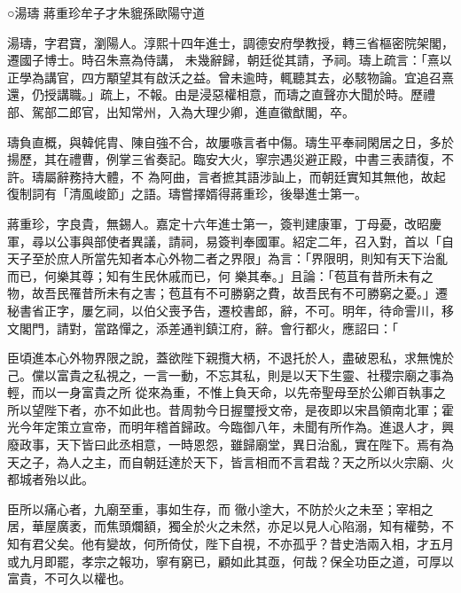 
\begin{pinyinscope}

 ○湯璹
 蔣重珍牟子才朱貔孫歐陽守道



 湯璹，字君寶，瀏陽人。淳熙十四年進士，調德安府學教授，轉三省樞密院架閣，遷國子博士。時召朱熹為侍講，
 未幾辭歸，朝廷從其請，予祠。璹上疏言：「熹以正學為講官，四方顒望其有啟沃之益。曾未逾時，輒聽其去，必駭物論。宜追召熹還，仍授講職。」疏上，不報。由是浸惡權相意，而璹之直聲亦大聞於時。歷禮部、駕部二郎官，出知常州，入為大理少卿，進直徽猷閣，卒。



 璹負直概，與韓侂胄、陳自強不合，故屢嗾言者中傷。璹生平奉祠閑居之日，多於揚歷，其在禮曹，例掌三省奏記。臨安大火，寧宗遇災避正殿，中書三表請復，不許。璹屬辭務持大體，不
 為阿曲，言者摭其語涉訕上，而朝廷實知其無他，故起復制詞有「清風峻節」之語。璹嘗擇婿得蔣重珍，後舉進士第一。



 蔣重珍，字良貴，無錫人。嘉定十六年進士第一，簽判建康軍，丁母憂，改昭慶軍，尋以公事與部使者異議，請祠，易簽判奉國軍。紹定二年，召入對，首以「自天子至於庶人所當先知者本心外物二者之界限」為言：「界限明，則知有天下治亂而已，何樂其尊；知有生民休戚而已，何
 樂其奉。」且論：「苞苴有昔所未有之物，故吾民罹昔所未有之害；苞苴有不可勝窮之費，故吾民有不可勝窮之憂。」遷秘書省正字，屢乞祠，以伯父喪予告，遷校書郎，辭，不可。明年，待命霅川，移文閣門，請對，當路憚之，添差通判鎮江府，辭。會行都火，應詔曰：「



 臣頃進本心外物界限之說，蓋欲陛下親攬大柄，不退托於人，盡破恩私，求無愧於己。儻以富貴之私視之，一言一動，不忘其私，則是以天下生靈、社稷宗廟之事為輕，而以一身富貴之所
 從來為重，不惟上負天命，以先帝聖母至於公卿百執事之所以望陛下者，亦不如此也。昔周勃今日握璽授文帝，是夜即以宋昌領南北軍；霍光今年定策立宣帝，而明年稽首歸政。今臨御八年，未聞有所作為。進退人才，興廢政事，天下皆曰此丞相意，一時恩怨，雖歸廟堂，異日治亂，實在陛下。焉有為天之子，為人之主，而自朝廷達於天下，皆言相而不言君哉？天之所以火宗廟、火都城者殆以此。



 臣所以痛心者，九廟至重，事如生存，而
 徹小塗大，不防於火之未至；宰相之居，華屋廣袤，而焦頭爛額，獨全於火之未然，亦足以見人心陷溺，知有權勢，不知有君父矣。他有變故，何所倚仗，陛下自視，不亦孤乎？昔史浩兩入相，才五月或九月即罷，孝宗之報功，寧有窮已，顧如此其亟，何哉？保全功臣之道，可厚以富貴，不可久以權也。




\end{pinyinscope}
